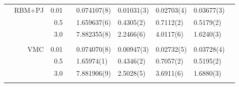 \begin{table}
\begin{tabularx}{\textwidth}{R{1cm}rrcR{2.3cm}R{2.3cm}R{2.3cm}R{2.3cm}R{0.3cm}}
		&RBM+PJ & 0.01 && 0.074107(8) & 0.01031(3) & 0.02703(4) & 0.03677(3) \\
		&& 0.5 && 1.659637(6) & 0.4305(2) & 0.7112(2) & 0.5179(2)\\
		&& 3.0 && 7.882355(8) & 2.2466(6) & 4.0117(6) & 1.6240(3) \\ \hdashline \\
		
		&VMC & 0.01 && 0.074070(8) & 0.00947(3) & 0.02732(5) & 0.03728(4) \\
		&& 0.5 && 1.65974(1) & 0.4346(2) & 0.7057(2) & 0.5195(2) & \\
		&& 3.0 && 7.881906(9) & 2.5028(5) & 3.6911(6) & 1.6880(3) \\ \hdashline \\
	\end{tabularx}
\end{table} 


